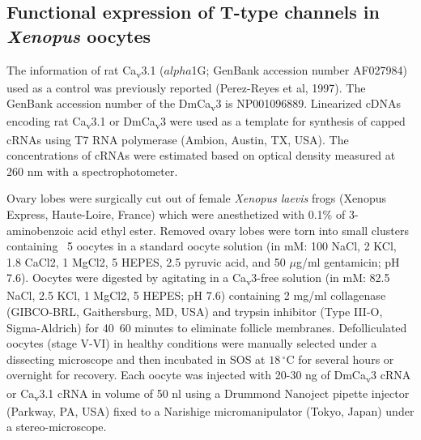 \subsection*{Functional expression of T-type channels in \emph{Xenopus} oocytes}

The information of rat Ca\textsubscript{v}3.1 ($alpha$1G; GenBank accession number AF027984) used as a control was previously reported (Perez-Reyes et al, 1997).
The GenBank accession number of the DmCa\textsubscript{v}3 is NP001096889.
Linearized cDNAs encoding rat Ca\textsubscript{v}3.1 or DmCa\textsubscript{v}3 were used as a template for synthesis of capped cRNAs using T7 RNA polymerase (Ambion, Austin, TX, USA).
The concentrations of cRNAs were estimated based on optical density measured at 260 nm with a spectrophotometer.

Ovary lobes were surgically cut out of female \emph{Xenopus laevis} frogs (Xenopus Express, Haute-Loire, France) which were anesthetized with 0.1\% of 3-aminobenzoic acid ethyl ester.
Removed ovary lobes were torn into small clusters containing ~5 oocytes in a standard oocyte solution (in mM: 100 NaCl, 2 KCl, 1.8 CaCl2, 1 MgCl2, 5 HEPES, 2.5 pyruvic acid, and 50 $\mu$g/ml gentamicin; pH 7.6).
Oocytes were digested by agitating in a Ca\textsubscript{v}3-free solution (in mM: 82.5 NaCl, 2.5 KCl, 1 MgCl2, 5 HEPES; pH 7.6) containing 2 mg/ml collagenase (GIBCO-BRL, Gaithersburg, MD, USA) and trypsin inhibitor (Type III-O, Sigma-Aldrich) for 40~60 minutes to eliminate follicle membranes.
Defolliculated oocytes (stage V-VI) in healthy conditions were manually selected under a dissecting microscope and then incubated in SOS at $18\,^{\circ}\mathrm{C}$ for several hours or overnight for recovery.
Each oocyte was injected with 20-30 ng of DmCa\textsubscript{v}3 cRNA or Ca\textsubscript{v}3.1 cRNA in volume of 50 nl using a Drummond Nanoject pipette injector (Parkway, PA, USA) fixed to a Narishige micromanipulator (Tokyo, Japan) under a stereo-microscope.
    